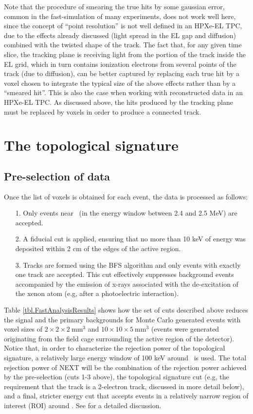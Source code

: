 \documentclass[a4paper,11pt]{article}
\begin{document}
Note that the procedure of smearing the true hits by some gaussian error, common in the fast-simulation of many experiments, does not work well here, since the concept of ``point resolution'' is not well defined in an HPXe-EL TPC, due to the effects already discussed (light spread in the EL gap and diffusion) combined with the twisted shape of the track. The fact that, for any given time slice, the tracking plane is receiving light from the portion of the track inside the EL grid, which in turn contains ionization electrons from several points of the track (due to diffusion), can be better captured by replacing each true hit by a voxel chosen to integrate the typical size of the above effects rather than by a ``smeared hit''. This is also the case when working with reconstructed data in an HPXe-EL TPC. As discussed above, the hits produced by the tracking plane must be replaced by voxels in order to produce a connected track. 

\section{The topological signature}
\label{sec.top}

\subsection{Pre-selection of data}
\label{ssec.prep}

 Once the list of voxels is obtained for each event, the data is processed as follows: 
\begin{enumerate}
	\item[1.] Only events near \Qbb\ (in the energy window between 2.4 and 2.5 MeV) are accepted.
	\item[2.] A fiducial cut is applied, ensuring that no more than 10 keV of energy was deposited within 2 cm of the edges of the active region.
	\item[3.] Tracks are formed using the BFS algorithm and only events with exactly one track are accepted.  This cut effectively suppresses background events accompanied by the emission of x-rays associated with the de-excitation of the xenon atom (e.g, after a photoelectric interaction). 
\end{enumerate}

Table \ref{tbl.FastAnalysisResults} shows how the set of cuts described above reduces the signal and the primary backgrounds for Monte Carlo generated events with voxel sizes of $2 \times 2 \times 2 \mathrm{~mm^3}$ and $10 \times 10 \times 5 \mathrm{~mm^3}$ (events were generated originating from the field cage surrounding the active region of the detector).  Notice that, in order to characterize the rejection power of the topological signature, a relatively large energy window of 100 keV around \Qbb\ is used. The total rejection power of NEXT will be the combination of the rejection power achieved by the pre-selection (cuts 1-3 above), the topological signature cut (e.g, the requirement that the track is a 2-electron track, discussed in more detail below), and a final, stricter energy cut that accepts events in a relatively narrow region of interest (ROI) around \Qbb. See \cite{Martin-Albo:2015rhw} for a detailed discussion.
\end{document}
